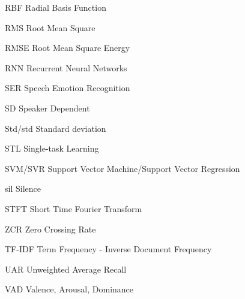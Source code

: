 \begin{abbreviations}
\item[RBF]  Radial Basis Function 
\item[RMS]  Root Mean Square
\item[RMSE] Root Mean Square Energy
\item[RNN]  Recurrent Neural Networks  
\item[SER]  Speech Emotion Recognition
\item[SD]   Speaker Dependent 
\item[Std/std]  Standard deviation
\item[STL]  Single-task Learning  
\item[SVM/SVR] Support Vector Machine/Support Vector Regression
\item[sil]  Silence 
\item[STFT] Short Time Fourier Transform 
\item[ZCR]  Zero Crossing Rate
\item[TF-IDF]   Term Frequency - Inverse Document Frequency
\item[UAR]  Unweighted Average Recall  
\item[VAD]  Valence, Arousal, Dominance 

\end{abbreviations}

